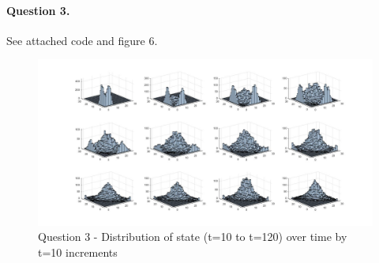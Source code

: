 \documentclass[11pt]{article}
\begin{document}
\paragraph{Question 3.} See attached code and figure 6.

\begin{landscape}
\begin{figure}[!h]
	
	\includegraphics[width=1.7\textwidth]{Figures/figure6.jpg}
	\caption{Question 3 - Distribution of state (t=10  to t=120) over time by t=10 increments}
\end{figure}
\end{landscape}
\end{document}
